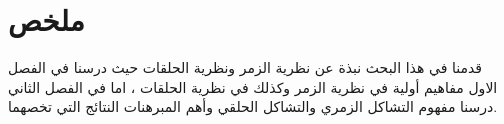 \chapter*{ملخص}
قدمنا في هذا البحث نبذة عن نظرية الزمر ونظرية الحلقات حيث درسنا في الفصل الاول مفاهيم أولية في نظرية الزمر وكذلك في نظرية الحلقات ، اما في الفصل الثاني درسنا مفهوم التشاكل الزمري والتشاكل الحلقي وأهم المبرهنات النتائج التي تخصهما. 